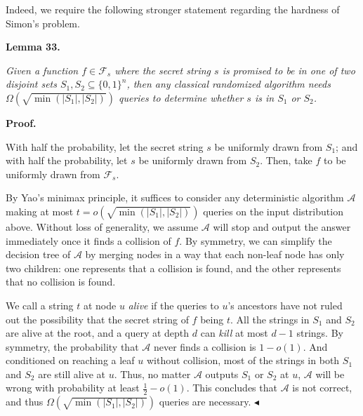 


Indeed, we require the following stronger statement regarding the hardness of Simon’s problem.\par





\par\medskip\noindent\textbf{
\textbf{Lemma 33}\textbf{.}
}\par



\emph{Given a function $f\in\mathcal{F}_{s}$
where the secret string $s$ is promised to be in one of two disjoint sets $S_{1},S_{2}\subseteq\{0,1\}^{n}$, then any classical randomized algorithm needs $\Omega(\sqrt{\min(|S_{1}|,|S_{2}|)})$ queries to determine whether $s$ is in $S_{1}$ or $S_{2}$.}\par






\par\medskip\noindent\textbf{Proof.}\par




With half the probability, let the secret string $s$ be uniformly drawn from $S_{1}$; and with half the probability, let $s$ be uniformly drawn from $S_{2}$. Then, take $f$ to be uniformly drawn from $\mathcal{F}_{s}$.\par




By Yao’s minimax principle, it suffices to consider any deterministic algorithm $\mathcal{A}$ making at most $t=o(\sqrt{\min(|S_{1}|,|S_{2}|)})$ queries on the input distribution above. Without loss of generality, we assume $\mathcal{A}$ will stop and output the answer immediately once it finds a collision of $f$.
By symmetry, we can simplify the decision tree of $\mathcal{A}$ by merging nodes in a way that each non-leaf node has only two children: one represents that a collision is found, and the other represents that no collision is found.\par




We call a string $t$ at node $u$ \emph{alive} if the queries to $u$’s ancestors have not ruled out the possibility that the secret string of $f$ being $t$. All the strings in $S_{1}$ and $S_{2}$ are alive at the root, and a query at depth $d$ can \emph{kill} at most $d-1$ strings. By symmetry, the probability that $\mathcal{A}$ never finds a collision is $1-o(1)$. And conditioned on reaching a leaf $u$ without collision, most of the strings in both $S_{1}$ and $S_{2}$ are still alive at $u$. Thus, no matter $\mathcal{A}$ outputs $S_{1}$ or $S_{2}$ at $u$, $\mathcal{A}$ will be wrong with probability at least $\frac{1}{2}-o(1)$. This concludes that $\mathcal{A}$ is not correct, and thus $\Omega(\sqrt{\min(|S_{1}|,|S_{2}|)})$ queries are necessary.
$\blacktriangleleft$\par




